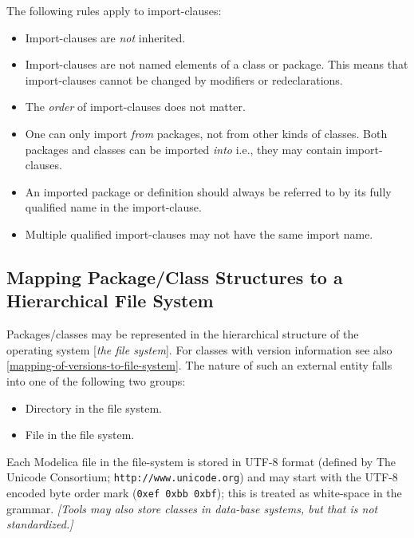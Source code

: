 The following rules apply to import-clauses:

\begin{itemize}
\item
  Import-clauses are \emph{not} inherited.
\item
  Import-clauses are not named elements of a class or package. This
  means that import-clauses cannot be changed by modifiers or
  redeclarations.
\item
  The \emph{order} of import-clauses does not matter.
\item
  One can only import \emph{from} packages, not from other kinds of
  classes. Both packages and classes can be imported \emph{into} i.e.,
  they may contain import-clauses.
\item
  An imported package or definition should always be referred to by its
  fully qualified name in the import-clause.
\item
  Multiple qualified import-clauses may not have the same import name.
\end{itemize}

\subsection{Mapping Package/Class Structures to a Hierarchical File System}

Packages/classes may be represented in the hierarchical structure of the
operating system {[}\emph{the file system}{]}. For classes with version
information see also \autoref{mapping-of-versions-to-file-system}. The nature of such an external
entity falls into one of the following two groups:

\begin{itemize}
\item
  Directory in the file system.
\end{itemize}

\begin{itemize}
\item
  File in the file system.
\end{itemize}

Each Modelica file in the file-system is stored in UTF-8 format (defined
by The Unicode Consortium; \lstinline!http://www.unicode.org!) and may start with
the UTF-8 encoded byte order mark (\lstinline!0xef 0xbb 0xbf!); this is treated as
white-space in the grammar. \emph{{[}Tools may also store classes in
data-base systems, but that is not standardized.{]}}

